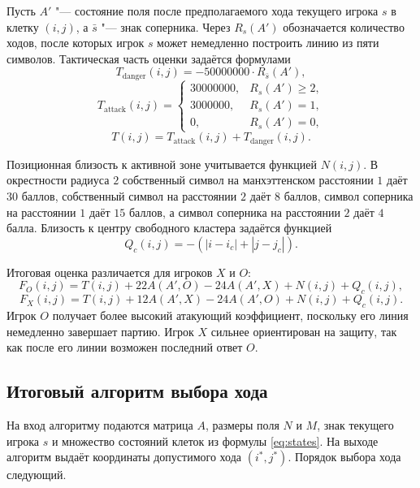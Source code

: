 \documentclass[a4paper,14pt]{extarticle}
\begin{document}
Пусть $A'$ "--- состояние поля после предполагаемого хода текущего игрока $s$ в клетку $(i,j)$, а $\bar{s}$ "--- знак соперника. Через $R_s(A')$ обозначается количество ходов, после которых игрок $s$ может немедленно построить линию из пяти символов. Тактическая часть оценки задаётся формулами
\begin{equation}
T_{\mathrm{danger}}(i,j)=-50000000\cdot R_{\bar{s}}(A'),
\label{eq:danger}
\end{equation}
\[
T_{\mathrm{attack}}(i,j)=
\begin{cases}
30000000, & R_s(A')\geq 2,\\
3000000, & R_s(A')=1,\\
0, & R_s(A')=0,
\end{cases}
\]
\[
T(i,j)=T_{\mathrm{attack}}(i,j)+T_{\mathrm{danger}}(i,j).
\]

Позиционная близость к активной зоне учитывается функцией $N(i,j)$. В окрестности радиуса $2$ собственный символ на манхэттенском расстоянии $1$ даёт $30$ баллов, собственный символ на расстоянии $2$ даёт $8$ баллов, символ соперника на расстоянии $1$ даёт $15$ баллов, а символ соперника на расстоянии $2$ даёт $4$ балла. Близость к центру свободного кластера задаётся функцией
\[
Q_c(i,j)=-(|i-i_c|+|j-j_c|).
\]

Итоговая оценка различается для игроков $X$ и $O$:
\begin{equation}
F_O(i,j)=T(i,j)+22A(A',O)-24A(A',X)+N(i,j)+Q_c(i,j),
\label{eq:o_score}
\end{equation}
\begin{equation}
F_X(i,j)=T(i,j)+12A(A',X)-24A(A',O)+N(i,j)+Q_c(i,j).
\label{eq:x_score}
\end{equation}
Игрок $O$ получает более высокий атакующий коэффициент, поскольку его линия немедленно завершает партию. Игрок $X$ сильнее ориентирован на защиту, так как после его линии возможен последний ответ $O$.

\subsection{Итоговый алгоритм выбора хода}

На вход алгоритму подаются матрица $A$, размеры поля $N$ и $M$, знак текущего игрока $s$ и множество состояний клеток из формулы \eqref{eq:states}. На выходе алгоритм выдаёт координаты допустимого хода $(i^*,j^*)$. Порядок выбора хода следующий.
\end{document}
